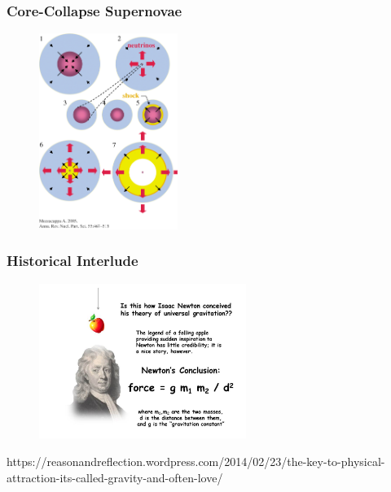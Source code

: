 \documentclass{beamer}
\begin{document}
\begin{frame}
\frametitle{Core-Collapse Supernovae}

  \begin{figure}[htb!]
    \centering
    \includegraphics[width=0.4\textwidth]{fig.CCSN_02.jpeg}
  \end{figure}

\end{frame}

\begin{frame}
\frametitle{Historical Interlude}

  \begin{figure}[htb!]
    \centering
    \includegraphics[width=0.6\textwidth]{fig.Newton.jpg}
  \end{figure}
https://reasonandreflection.wordpress.com/2014/02/23/the-key-to-physical-attraction-its-called-gravity-and-often-love/

\end{frame}
\end{document}
